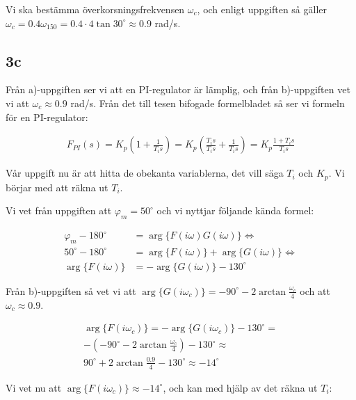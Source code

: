 \documentclass[a4paper]{article}
\begin{document}
Vi ska bestämma överkorsningsfrekvensen $\omega_c$, och enligt uppgiften så gäller $\omega_c = 0.4\omega_{150} = 0.4 \cdot 4\tan 30^\circ \approx 0.9$ rad/s.


\subsection{3c}
Från a)-uppgiften ser vi att en PI-regulator är lämplig, och från b)-uppgiften vet vi att $\omega_c \approx 0.9$ rad/s. Från det till tesen bifogade formelbladet så ser vi formeln för en PI-regulator:

\begin{align*}
  F_{PI}(s) = K_p\left( 1 + \frac{1}{T_i s}\right ) = K_p\left( \frac{T_i s}{T_i s} + \frac{1}{T_i s}\right ) = K_p\frac{1 + T_i s}{T_i s}
\end{align*}

Vår uppgift nu är att hitta de obekanta variablerna, det vill säga $T_i$ och $K_p$. Vi börjar med att räkna ut $T_i$.

Vi vet från uppgiften att $\varphi_m = 50^\circ$ och vi nyttjar följande kända formel:

\begin{align*}
  \varphi_m - 180^\circ &=  \arg \{ F(i\omega)G(i\omega) \} \Longleftrightarrow\\
  50^\circ - 180^\circ  &=  \arg \{ F(i\omega) \} + \arg \{ G(i\omega) \}\Longleftrightarrow\\
  \arg \{ F(i\omega) \} &= -\arg \{ G(i\omega) \} -130^\circ
\end{align*}

Från b)-uppgiften så vet vi att $\arg \{ G(i\omega_c) \} = -90^\circ -2\arctan\frac{\omega_c}{4}$ och att $\omega_c \approx 0.9$.

\begin{align*}
  \arg \{ F(i\omega_c) \} = -\arg \{ G(i\omega_c) \} -130^\circ =\\
  -(-90^\circ -2\arctan\frac{\omega_c}{4}) -130^\circ \approx \\
  90^\circ + 2\arctan\frac{0.9}{4} -130^\circ \approx -14^\circ
\end{align*}

Vi vet nu att $\arg \{ F(i\omega_c) \} \approx -14^\circ$, och kan med hjälp av det räkna ut $T_i$:
\end{document}
